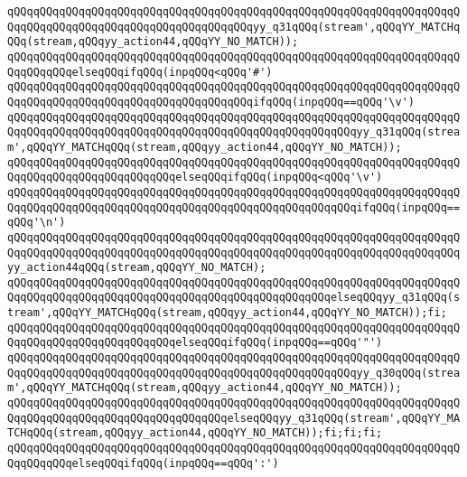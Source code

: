 \verb|qQQqqQQqqQQqqQQqqQQqqQQqqQQqqQQqqQQqqQQqqQQqqQQqqQQqqQQqqQQqqQQqqQQqqQQqqQQqqQQqqQQqqQQqqQQqqQQqqQQqqQQqqQQqyy_q31qQQq(stream',qQQqYY_MATCHqQQq(stream,qQQqyy_action44,qQQqYY_NO_MATCH));|\newline
\verb|qQQqqQQqqQQqqQQqqQQqqQQqqQQqqQQqqQQqqQQqqQQqqQQqqQQqqQQqqQQqqQQqqQQqqQQqqQQqqQQqelseqQQqifqQQq(inpqQQq<qQQq'#')|\newline
\verb|qQQqqQQqqQQqqQQqqQQqqQQqqQQqqQQqqQQqqQQqqQQqqQQqqQQqqQQqqQQqqQQqqQQqqQQqqQQqqQQqqQQqqQQqqQQqqQQqqQQqqQQqqQQqifqQQq(inpqQQq==qQQq'\v')|\newline
\verb|qQQqqQQqqQQqqQQqqQQqqQQqqQQqqQQqqQQqqQQqqQQqqQQqqQQqqQQqqQQqqQQqqQQqqQQqqQQqqQQqqQQqqQQqqQQqqQQqqQQqqQQqqQQqqQQqqQQqqQQqqQQqyy_q31qQQq(stream',qQQqYY_MATCHqQQq(stream,qQQqyy_action44,qQQqYY_NO_MATCH));|\newline
\verb|qQQqqQQqqQQqqQQqqQQqqQQqqQQqqQQqqQQqqQQqqQQqqQQqqQQqqQQqqQQqqQQqqQQqqQQqqQQqqQQqqQQqqQQqqQQqqQQqelseqQQqifqQQq(inpqQQq<qQQq'\v')|\newline
\verb|qQQqqQQqqQQqqQQqqQQqqQQqqQQqqQQqqQQqqQQqqQQqqQQqqQQqqQQqqQQqqQQqqQQqqQQqqQQqqQQqqQQqqQQqqQQqqQQqqQQqqQQqqQQqqQQqqQQqqQQqqQQqifqQQq(inpqQQq==qQQq'\n')|\newline
\verb|qQQqqQQqqQQqqQQqqQQqqQQqqQQqqQQqqQQqqQQqqQQqqQQqqQQqqQQqqQQqqQQqqQQqqQQqqQQqqQQqqQQqqQQqqQQqqQQqqQQqqQQqqQQqqQQqqQQqqQQqqQQqqQQqqQQqqQQqqQQqyy_action44qQQq(stream,qQQqYY_NO_MATCH);|\newline
\verb|qQQqqQQqqQQqqQQqqQQqqQQqqQQqqQQqqQQqqQQqqQQqqQQqqQQqqQQqqQQqqQQqqQQqqQQqqQQqqQQqqQQqqQQqqQQqqQQqqQQqqQQqqQQqqQQqqQQqqQQqelseqQQqyy_q31qQQq(stream',qQQqYY_MATCHqQQq(stream,qQQqyy_action44,qQQqYY_NO_MATCH));fi;|\newline
\verb|qQQqqQQqqQQqqQQqqQQqqQQqqQQqqQQqqQQqqQQqqQQqqQQqqQQqqQQqqQQqqQQqqQQqqQQqqQQqqQQqqQQqqQQqqQQqqQQqelseqQQqifqQQq(inpqQQq==qQQq'"')|\newline
\verb|qQQqqQQqqQQqqQQqqQQqqQQqqQQqqQQqqQQqqQQqqQQqqQQqqQQqqQQqqQQqqQQqqQQqqQQqqQQqqQQqqQQqqQQqqQQqqQQqqQQqqQQqqQQqqQQqqQQqqQQqqQQqyy_q30qQQq(stream',qQQqYY_MATCHqQQq(stream,qQQqyy_action44,qQQqYY_NO_MATCH));|\newline
\verb|qQQqqQQqqQQqqQQqqQQqqQQqqQQqqQQqqQQqqQQqqQQqqQQqqQQqqQQqqQQqqQQqqQQqqQQqqQQqqQQqqQQqqQQqqQQqqQQqqQQqqQQqelseqQQqyy_q31qQQq(stream',qQQqYY_MATCHqQQq(stream,qQQqyy_action44,qQQqYY_NO_MATCH));fi;fi;fi;|\newline
\verb|qQQqqQQqqQQqqQQqqQQqqQQqqQQqqQQqqQQqqQQqqQQqqQQqqQQqqQQqqQQqqQQqqQQqqQQqqQQqqQQqelseqQQqifqQQq(inpqQQq==qQQq':')|\newline
